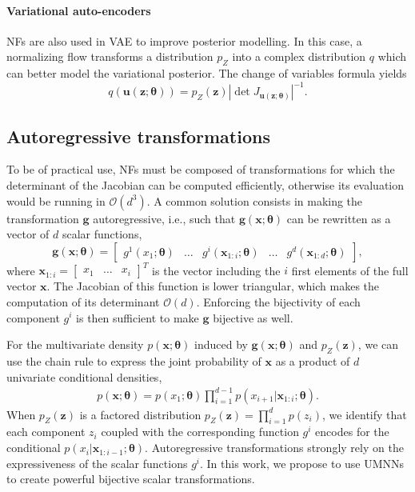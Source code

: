 \paragraph{Variational auto-encoders}
NFs are also used in VAE to improve posterior modelling.
In this case, a normalizing flow transforms a distribution $p_Z$ into a complex distribution $q$ which can better model the variational posterior.
The change of variables formula yields
\begin{equation}
    q(\mathbf{u}(\mathbf{z}; \mathbf{\theta})) = p_Z(\mathbf{z}) \left|\det J_{\mathbf{u}(\mathbf{z};\mathbf{\theta})} \right|^{-1}.\label{eq:NF_VI}
\end{equation}


\subsection{Autoregressive transformations}

To be of practical use, NFs must be composed of transformations for which the determinant of the Jacobian can be computed efficiently, otherwise its evaluation would be running in $\mathcal{O} (d^3)$.
A common solution consists in making the transformation $\mathbf{g}$ autoregressive, i.e., such that $\mathbf{g}(\mathbf{x};\mathbf{\theta})$ can be rewritten as a vector of $d$ scalar functions,
$$ \mathbf{g}(\mathbf{x};\mathbf{\theta}) = \begin{bmatrix}
g^1(x_{1}; \mathbf{\theta}) & \hdots &  g^i(\mathbf{x}_{1 : i}; \mathbf{\theta}) & \hdots & g^d(\mathbf{x}_{1 : d}; \mathbf{\theta})
\end{bmatrix}, $$
where $\mathbf{x}_{1 : i} = \begin{bmatrix} x_1 & \hdots & x_i \end{bmatrix}^T$ is the vector including the $i$ first elements of the full vector $\mathbf{x}$. The Jacobian of this function is lower triangular, which makes the computation of its determinant $\mathcal{O}(d)$.
Enforcing the bijectivity of each component $g^i$ is then sufficient to make $\mathbf{g}$ bijective as well.

For the multivariate density $p(\mathbf{x}; \mathbf{\theta})$ induced by $\mathbf{g}(\mathbf{x};\mathbf{\theta})$ and $p_Z(\mathbf{z})$, we can use the chain rule to express the joint probability of $\mathbf{x}$ as a product of $d$ univariate conditional densities,
\begin{align}
    p(\mathbf{x}; \mathbf{\theta}) = p(x_1; \mathbf{\theta})\prod^{d-1}_{i=1}p(x_{i+1}|\mathbf{x}_{1:i}; \mathbf{\theta}).
\end{align}
When $p_Z(\mathbf{z})$ is a factored distribution $p_Z(\mathbf{z}) = \prod^{d}_{i=1}p(z_i)$, we identify that each component $z_i$ coupled with the corresponding function $g^i$ encodes for the conditional $p(x_{i}|\mathbf{x}_{1:i-1}; \mathbf{\theta})$.
%
Autoregressive transformations strongly rely on the expressiveness of the scalar functions $g^i$.
In this work, we propose to use UMNNs to create powerful bijective scalar transformations.


